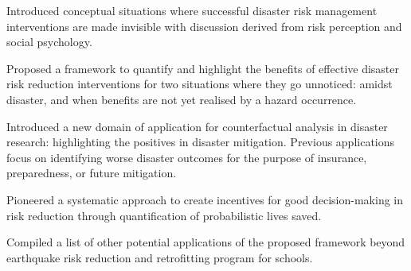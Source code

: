 \begin{enumerate}
Introduced conceptual situations where successful disaster risk management interventions are made invisible with discussion derived from risk perception and social psychology.

Proposed a framework to quantify and highlight the benefits of effective disaster risk reduction interventions for two situations where they go unnoticed: amidst disaster, and when benefits are not yet realised by a hazard occurrence.

Introduced a new domain of application for counterfactual analysis in disaster research: highlighting the positives in disaster mitigation. Previous applications focus on identifying worse disaster outcomes for the purpose of insurance, preparedness, or future mitigation.

Pioneered a systematic approach to create incentives for good decision-making in risk reduction through quantification of probabilistic lives saved.

Compiled a list of other potential applications of the proposed framework beyond earthquake risk reduction and retrofitting program for schools.

\end{enumerate}

